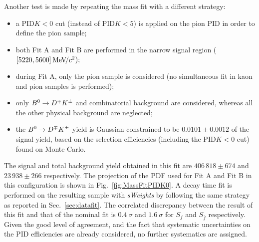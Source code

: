 Another test is made by repeating the mass fit with a different strategy:
\begin{itemize}[noitemsep,topsep=0pt]
  \item a PID$K<0$ cut (instead of PID$K<5$) is applied on the pion PID in order to define the pion sample;
  \item both Fit A and Fit B are performed in the narrow signal region ($[5220,5600]{\mathrm{\,Me\kern -0.1em V\!/}c^2}$);
  \item during Fit A, only the pion sample is considered (no simultaneous fit in kaon and pion samples is performed);
  \item only $B^0\rightarrow D^\mp K^\pm$ and combinatorial background are considered, whereas all the other physical background are neglected;
  \item the $B^0\rightarrow D^\mp K^\pm$ yield is Gaussian constrained to be $0.0101\pm0.0012$ of the signal yield, based on the selection efficiencies 
    (including the PID$K<0$ cut) found on Monte Carlo.
\end{itemize}
The signal and total background yield obtained in this fit are $406\,818\pm674$ and $23\,938\pm266$ respectively.
The projection of the PDF used for Fit A and Fit B in this configuration is shown in Fig.~\ref{fig:MassFitPIDK0}. 
A decay time fit is performed on the resulting sample with \emph{sWeights}
by following the same strategy as reported in Sec.~\ref{sec:datafit}. The correlated discrepancy between the result of this fit and that of the nominal fit is $0.4~\sigma$
and $1.6~\sigma$ for $S_f$ and $S_{\bar f}$ respectively. Given the good level of agreement, and the fact that systematic uncertainties on the PID efficiencies are already considered, no further systematics are assigned.

